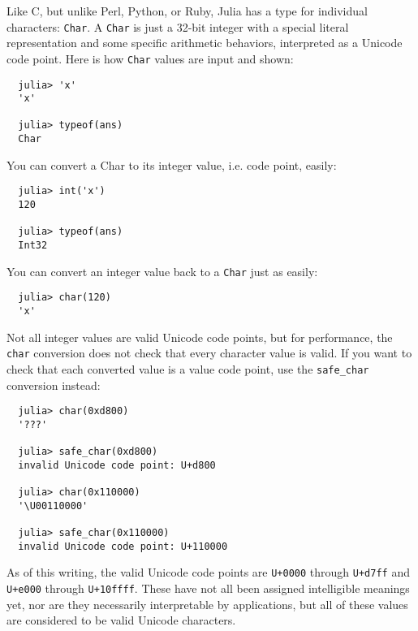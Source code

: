 \documentclass{article}
\begin{document}
Like C, but unlike Perl, Python, or Ruby, Julia has a type for individual characters: \verb|Char|.
A \verb|Char| is just a 32-bit integer with a special literal representation and some specific arithmetic behaviors, interpreted as a Unicode code point.
Here is how \verb|Char| values are input and shown:
\begin{verbatim}
  julia> 'x'
  'x'

  julia> typeof(ans)
  Char
\end{verbatim}
You can convert a Char to its integer value, i.e. code point, easily:
\begin{verbatim}
  julia> int('x')
  120

  julia> typeof(ans)
  Int32
\end{verbatim}
You can convert an integer value back to a \verb|Char| just as easily:
\begin{verbatim}
  julia> char(120)
  'x'
\end{verbatim}
Not all integer values are valid Unicode code points, but for performance, the \verb|char| conversion does not check that every character value is valid.
If you want to check that each converted value is a value code point, use the \verb|safe_char| conversion instead:
\begin{verbatim}
  julia> char(0xd800)
  '???'

  julia> safe_char(0xd800)
  invalid Unicode code point: U+d800

  julia> char(0x110000)
  '\U00110000'

  julia> safe_char(0x110000)
  invalid Unicode code point: U+110000
\end{verbatim}
As of this writing, the valid Unicode code points are \verb|U+0000| through \verb|U+d7ff| and \verb|U+e000| through \verb|U+10ffff|.
These have not all been assigned intelligible meanings yet, nor are they necessarily interpretable by applications, but all of these values are considered to be valid Unicode characters.
\end{document}
